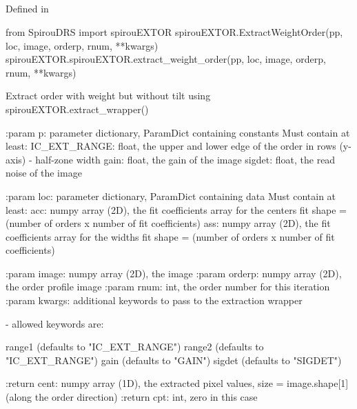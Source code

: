 
\noindent\begin{minipage}{\textwidth}
\subsection{}

Defined in \spirouEXTOR{}

\begin{pythonbox}
from SpirouDRS import spirouEXTOR
spirouEXTOR.ExtractWeightOrder(pp, loc, image, orderp, rnum, **kwargs)
spirouEXTOR.spirouEXTOR.extract_weight_order(pp, loc, image, orderp, rnum, **kwargs)
\end{pythonbox}

\begin{pythondocstring}
Extract order with weight but without tilt using
spirouEXTOR.extract_wrapper()

:param p: parameter dictionary, ParamDict containing constants
    Must contain at least:
            IC_EXT_RANGE: float, the upper and lower edge of the order
                          in rows (y-axis) - half-zone width
            gain: float, the gain of the image
            sigdet: float, the read noise of the image

:param loc: parameter dictionary, ParamDict containing data
        Must contain at least:
            acc: numpy array (2D), the fit coefficients array for
                  the centers fit
                  shape = (number of orders x number of fit coefficients)
            ass: numpy array (2D), the fit coefficients array for
                  the widths fit
                  shape = (number of orders x number of fit coefficients)

:param image: numpy array (2D), the image
:param orderp: numpy array (2D), the order profile image
:param rnum: int, the order number for this iteration
:param kwargs: additional keywords to pass to the extraction wrapper

        - allowed keywords are:

        range1  (defaults to "IC_EXT_RANGE")
        range2  (defaults to "IC_EXT_RANGE")
        gain    (defaults to "GAIN")
        sigdet  (defaults to "SIGDET")

:return cent: numpy array (1D), the extracted pixel values,
             size = image.shape[1] (along the order direction)
:return cpt: int, zero in this case
\end{pythondocstring}
\end{minipage}


